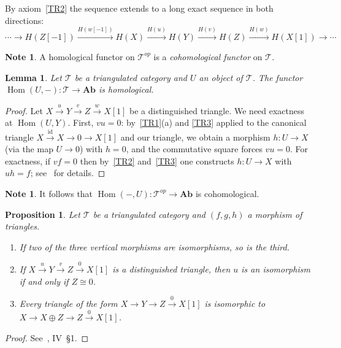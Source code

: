 \documentclass[12pt,a4paper]{article}
\newtheorem{proposition}[theorem]{Proposition}
\newtheorem{lemma}[theorem]{Lemma}
\theoremstyle{definition}
\newtheorem{note}[theorem]{Note}
\newcommand{\Ab}{\mathbf{Ab}}
\newcommand{\Hom}{\operatorname{Hom}}
\newcommand{\id}{\mathrm{id}}
\begin{document}
By axiom~\ref{TR2} the sequence extends to a long exact sequence in both directions:
\[
  \cdots\to H(Z[-1])\xrightarrow{H(w[-1])} H(X)\xrightarrow{H(u)} H(Y)
  \xrightarrow{H(v)} H(Z)\xrightarrow{H(w)} H(X[1])\to\cdots
\]

\begin{note}
A homological functor on $\mathcal{T}^{op}$ is a \emph{cohomological functor} on
$\mathcal{T}$.
\end{note}

\begin{lemma}\label{lem:Hom-homological}
Let $\mathcal{T}$ be a triangulated category and $U$ an object of $\mathcal{T}$.
The functor $\Hom(U,-):\mathcal{T}\to\Ab$ is homological.
\end{lemma}

\begin{proof}
Let $X\xrightarrow{u} Y\xrightarrow{v} Z\xrightarrow{w} X[1]$ be a distinguished
triangle.  We need exactness at $\Hom(U,Y)$.  First, $vu=0$: by~\ref{TR1}(a) and
\ref{TR3} applied to the canonical triangle $X\xrightarrow{\id}X\to 0\to X[1]$ and
our triangle, we obtain a morphism $h:U\to X$ (via the map $U\to 0$) with $h=0$, and
the commutative square forces $vu=0$.  For exactness, if $vf=0$ then by~\ref{TR2}
and~\ref{TR3} one constructs $h:U\to X$ with $uh=f$; see~\cite{BBD} for details.
\end{proof}

\begin{note}
It follows that $\Hom(-,U):\mathcal{T}^{op}\to\Ab$ is cohomological.
\end{note}

\begin{proposition}\label{prop:TC-properties}
Let $\mathcal{T}$ be a triangulated category and $(f,g,h)$ a morphism of triangles.
\begin{enumerate}
  \item If two of the three vertical morphisms are isomorphisms, so is the third.
  \item If $X\xrightarrow{u} Y\xrightarrow{v} Z\xrightarrow{0} X[1]$ is a
    distinguished triangle, then $u$ is an isomorphism if and only if $Z\cong 0$.
  \item Every triangle of the form $X\to Y\to Z\xrightarrow{0} X[1]$ is isomorphic
    to $X\to X\oplus Z\to Z\xrightarrow{0} X[1]$.
\end{enumerate}
\end{proposition}
\begin{proof}
See~\cite{BBD}, IV~\S1.
\end{proof}
\end{document}
